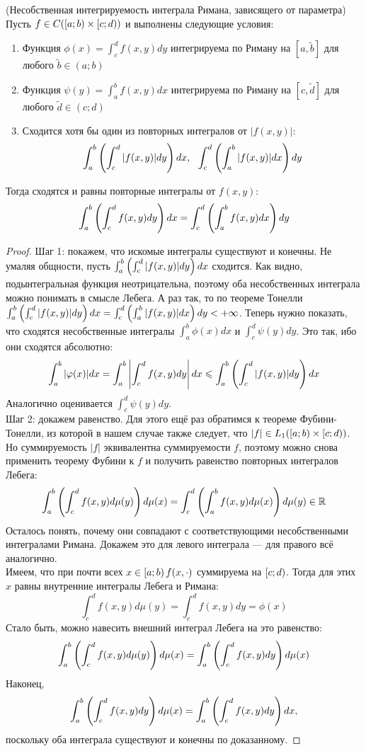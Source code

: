 \begin{theorem} (Несобственная интегрируемость интеграла Римана, зависящего от параметра)
	Пусть $f \in C(\left[a; b\right) \times \left[c; d\right))$ и выполнены следующие условия:
	\begin{enumerate}
		\item Функция $\phi(x) = \int_c^d f(x,y)dy$ интегрируема по Риману на $[a, \tilde{b}]$ для любого $\tilde{b} \in (a; b)$

		\item Функция $\psi(y) = \int_a^b f(x,y)dx$ интегрируема по Риману на $[c, \tilde{d}]$ для любого $\tilde{d} \in (c; d)$ 
		
		\item Сходится хотя бы один из повторных интегралов от $|f(x, y)|$:
		\[
			\int_a^b \ps{\int_c^d |f(x, y)|dy}dx,\ \ \int_c^d \ps{\int_a^b |f(x, y)|dx}dy
		\]
	\end{enumerate}
	Тогда сходятся и равны повторные интегралы от $f(x, y)$:
	\[
		\int_a^b \left(\int_c^d f(x, y)dy\right)dx = \int_c^d \left(\int_a^b f(x, y)dx\right)dy
	\]
\end{theorem}

\begin{proof}
	Шаг 1: покажем, что искомые интегралы существуют и конечны. Не умаляя общности, пусть $\int_a^b \left(\int_c^d |f(x, y)|dy\right)dx$ сходится. Как видно, подынтегральная функция неотрицательна, поэтому оба несобственных интеграла можно понимать в смысле Лебега. А раз так, то по теореме Тонелли $\int_a^b \left(\int_c^d |f(x, y)|dy\right)dx = \int_c^d \left(\int_a^b |f(x, y)|dx\right)dy < +\infty$. Теперь нужно показать, что сходятся несобственные интегралы $\int_a^b \phi(x) dx$ и $\int_c^d \psi(y) dy$. Это так, ибо они сходятся абсолютно:
	\[
		\int_a^b |\varphi(x)| dx = \int_a^b \left|\int_c^d f(x, y)dy\right|dx \leqslant \int_a^b \left(\int_c^d |f(x, y)|dy\right)dx
	\]
	Аналогично оценивается $\int_c^d \psi(y) dy$. \\
	Шаг 2: докажем равенство. Для этого ещё раз обратимся к теореме Фубини-Тонелли, из которой в нашем случае также следует, что $|f| \in L_1(\left[a; b\right) \times \left[c; d\right))$. Но суммируемость $|f|$ эквивалентна суммируемости $f$, поэтому можно снова применить теорему Фубини к $f$ и получить равенство повторных интегралов Лебега:	
	\[
		\int_a^b \left(\int_c^d f(x, y)d\mu(y)\right)d\mu(x) = \int_c^d \left(\int_a^b f(x, y)d\mu(x)\right)d\mu(y) \in \mathbb{R}
	\]
	Осталось понять, почему они совпадают с соответствующими несобственными интегралами Римана. Докажем это для левого интеграла --- для правого всё аналогично. \\
	Имеем, что при почти всех $x \in \left[a; b\right) f(x, \cdot)$ суммируема на $\left[c; d\right)$. Тогда для этих $x$ равны внутренние интегралы Лебега и Римана:
	\[
		\int_c^d f(x, y)d\mu(y) = \int_c^d f(x, y)dy = \phi(x)
	\]
	Стало быть, можно навесить внешний интеграл Лебега на это равенство:
	\[
		\int_a^b \left(\int_c^d f(x, y)d\mu(y)\right)d\mu(x) = \int_a^b \left(\int_c^d f(x, y)dy\right)d\mu(x)
	\]
	Наконец,
	\[
		\int_a^b \left(\int_c^d f(x, y)dy\right)d\mu(x) = \int_a^b \left(\int_c^d f(x, y)dy\right)dx,
	\]
	поскольку оба интеграла существуют и конечны по доказанному.
\end{proof}

